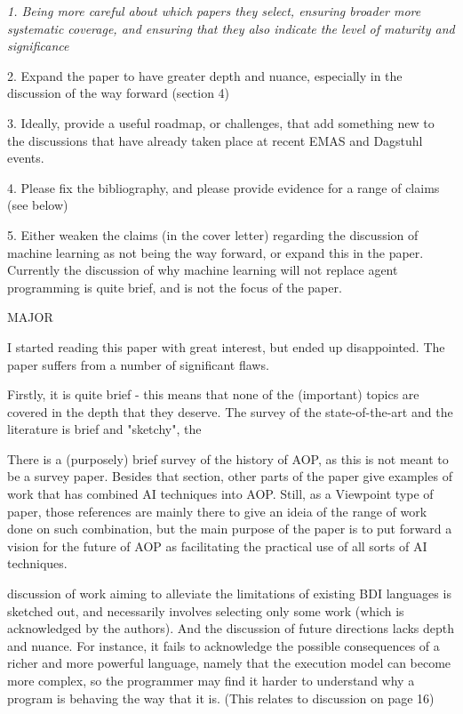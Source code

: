 \documentclass[12pt]{article}
\newenvironment{reviews}{\bigskip\itshape}{\upshape\bigskip}
\newenvironment{response}{\bigskip\normalfont}{\bigskip}
\begin{document}
\begin{reviews}
1. Being more careful about which papers they select, ensuring broader more systematic coverage, and ensuring that they also indicate the level of maturity and significance 

2. Expand the paper to have greater depth and nuance, especially in the discussion of the way forward (section 4)

3. Ideally, provide a useful roadmap, or challenges, that add something new to the discussions that have already taken place at recent EMAS and Dagstuhl events.  

4. Please fix the bibliography, and please provide evidence for a range of claims (see below)

5. Either weaken the claims (in the cover letter) regarding the discussion of machine learning as not being the way forward, or expand this in the paper. Currently the discussion of why machine learning will not replace agent programming is quite brief, and is not the focus of the paper. 


MAJOR

I started reading this paper with great interest, but ended up disappointed. The paper suffers from a number of significant flaws.

Firstly, it is quite brief - this means that none of the (important) topics are covered in the depth that they deserve. The survey of the state-of-the-art and the literature is brief and "sketchy", the

\begin{response}
There is a (purposely) brief survey of the history of AOP, as this is not meant to be a survey paper. Besides that section, other parts of the paper give examples of work that has combined AI techniques into AOP. Still, as a Viewpoint type of paper, those references are mainly there to give an ideia of the range of work done on such combination, but the main purpose of the paper is to put forward a vision for the future of AOP as facilitating the practical use of all sorts of AI techniques.
\end{response}

discussion of work aiming to alleviate the limitations of existing BDI languages is sketched out, and necessarily involves selecting only some work (which is acknowledged by the authors). And the discussion of future directions lacks depth and nuance. For instance, it fails to acknowledge the possible consequences of a richer and more powerful language, namely that the execution model can become more complex, so the programmer may find it harder to understand why a program is behaving the way that it is.  (This relates to discussion on page 16)


\end{reviews}
\end{document}
